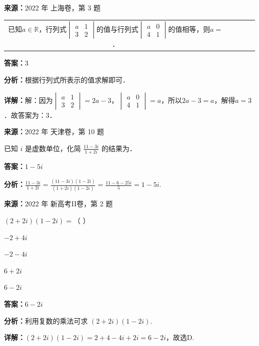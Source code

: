 \begin{question}[points=4]
\textbf{来源：}2022 年 上海卷，第 3 题\par
\begin{center}

\begin{tabular}{ccccc}

已知$a \in \mathbb{R}$，行列式$\begin{vmatrix} a & 1 \\ 3 & 2 \end{vmatrix}$的值与行列式$\begin{vmatrix} a & 0 \\ 4 & 1 \end{vmatrix}$的值相等，则$a=$ ．

\end{tabular}

\end{center}
\fillin[{$3$}]
\begin{solution}
\textbf{答案：}$3$

\textbf{分析：}根据行列式所表示的值求解即可．

\textbf{详解：}解：因为$\begin{vmatrix} a & 1 \\ 3 & 2 \end{vmatrix}=2a-3$，$\begin{vmatrix} a & 0 \\ 4 & 1 \end{vmatrix}=a$，所以$2a-3=a$，解得$a=3$．故答案为：$3$．
\end{solution}
\end{question}

\begin{question}[points=5]
\textbf{来源：}2022 年 天津卷，第 10 题\par
已知 $i$ 是虚数单位，化简 $\frac{11-3i}{1+2i}$ 的结果为．
\fillin[{$1-5i$}]
\begin{solution}
\textbf{答案：}$1-5i$

\textbf{分析：}$\frac{11-3i}{1+2i}=\frac{(11-3i)(1-2i)}{(1+2i)(1-2i)}=\frac{11-6-25i}{5}=1-5i$.
\end{solution}
\end{question}

\begin{question}[points=5]
\textbf{来源：}2022 年 新高考II卷，第 2 题\par
$(2+2i)(1-2i)=$（ ）
\begin{choices}
  \item $-2+4i$
  \item $-2-4i$
  \item $6+2i$
  \item $6-2i$
\end{choices}
\begin{solution}
\textbf{答案：}$6-2i$

\textbf{分析：}利用复数的乘法可求 $(2+2i)(1-2i)$.

\textbf{详解：}$(2+2i)(1-2i)=2+4-4i+2i=6-2i$，故选D.
\end{solution}
\end{question}


